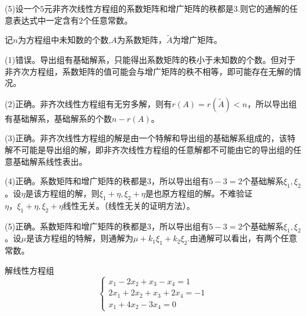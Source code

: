\documentclass[a4paper]{report}
\begin{document}
(5)设一个$5$元非齐次线性方程组的系数矩阵和增广矩阵的秩都是$3$.则它的通解的任意表达式中一定含有$2$个任意常数。

\begin{jie}
记$n$为方程组中未知数的个数,$A$为系数矩阵，$\widetilde{A}$为增广矩阵。

(1)错误。导出组有基础解系，只能得出系数矩阵的秩小于未知数的个数。但对于非齐次方程组，系数矩阵的值可能会与增广矩阵的秩不相等，即可能存在无解的情况。

(2)正确。非齐次线性方程组有无穷多解，则有$r(A)=r(\widetilde{A})<n$，所以导出组有基础解系，基础解系的个数$n-r(A)$。

(3)正确。非齐次线性方程组的解是由一个特解和导出组的基础解系组成的，该特解不可能是导出组的解，即非齐次线性方程组的任意解都不可能由它的导出组的任意基础解系线性表出。

(4)正确。系数矩阵和增广矩阵的秩都是$3$，所以导出组有$5-3=2$个基础解系$\xi_1,\xi_2$。设$\eta$是该方程组的解，则$\xi_1+\eta,\xi_2+\eta$是也原方程组的解。不难验证$\eta，\xi_1+\eta,\xi_2+\eta$线性无关。（线性无关的证明方法）。

(5)正确。系数矩阵和增广矩阵的秩都是$3$，所以导出组有$5-3=2$个基础解系$\xi_1,\xi_2$。设$\mu$是该方程组的特解，则通解为$\mu+k_1\xi_1+k_2\xi_2$.由通解可以看出，有两个任意常数。
\end{jie}

\EX 解线性方程组
\begin{equation*}
\begin{cases}
x_1-2x_2+x_3-x_4=1\\
2x_1+2x_2+x_3+2x_4=-1\\
x_1+4x_2-3x_4=0
\end{cases}
\end{equation*}
\end{document}
